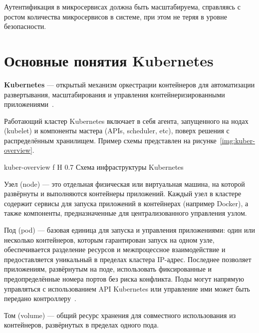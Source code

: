 Аутентификация в микросервисах должна быть масштабируема, справляясь с ростом количества микросервисов в системе, при этом не теряя в уровне безопасности.~\cite{m_auth}












\section{Основные понятия Kubernetes}

\textbf{Kubernetes} --- открытый механизм оркестрации контейнеров для автоматизации развертывания, масштабирования и управления контейнеризированными приложениями~\cite{kubernetes}.

Работающий кластер Kubernetes включает в себя агента, запущенного на нодах (kubelet) и компоненты мастера (APIs, scheduler, etc), поверх решения с распределённым хранилищем. Пример схемы представлен на рисунке~\ref{img:kuber-overview}.

    {kuber-overview}
    {f}
    {H}
    {0.7\textwidth}
    {Схема инфраструктуры Kubernetes}

Узел (node) --- это отдельная физическая или виртуальная машина, на которой развёрнуты и выполняются контейнеры приложений. Каждый узел в кластере содержит сервисы для запуска приложений в контейнерах (например Docker), а также компоненты, предназначенные для централизованного управления узлом.

Под (pod) --- базовая единица для запуска и управления приложениями: один или несколько контейнеров, которым гарантирован запуск на одном узле, обеспечивается разделение ресурсов и межпроцессное взаимодействие и предоставляется уникальный в пределах кластера IP-адрес. Последнее позволяет приложениям, развёрнутым на поде, использовать фиксированные и предопределённые номера портов без риска конфликта. Поды могут напрямую управляться с использованием API Kubernetes или управление ими может быть передано контроллеру~\cite{kubernetes}.

Том (volume) --- общий ресурс хранения для совместного использования из контейнеров, развёрнутых в пределах одного пода.

